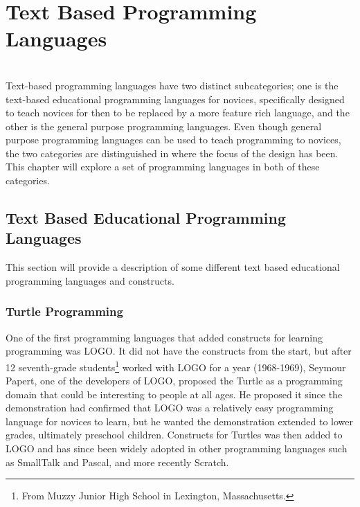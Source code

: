 \section{Text Based Programming Languages}
\label{sec:text_based_programming_languages}
\\
Text-based programming languages have two distinct subcategories; one is the text-based educational programming languages for novices, specifically designed to teach novices for then to be replaced by a more feature rich language, and the other is the general purpose programming languages. Even though general purpose programming languages can be used to teach programming to novices, the two categories are distinguished in where the focus of the design has been. This chapter will explore a set of programming languages in both of these categories.

\subsection{Text Based Educational Programming Languages}
This section will provide a description of some different text based educational programming languages and constructs.
\subsubsection{Turtle Programming}
One of the first programming languages that added constructs for learning programming was LOGO. It did not have the constructs from the start, but after 12 seventh-grade students\footnote{From Muzzy Junior High School in Lexington, Massachusetts.} worked with LOGO for a year (1968-1969), Seymour Papert, one of the developers of LOGO, proposed the Turtle as a programming domain that could be interesting to people at all ages. He proposed it since the demonstration had confirmed that LOGO was a relatively easy programming language for novices to learn, but he wanted the demonstration extended to lower grades, ultimately preschool children. Constructs for Turtles was then added to LOGO and has since been widely adopted in other programming languages such as SmallTalk and Pascal, and more recently Scratch\cite{turtle_origin}.

